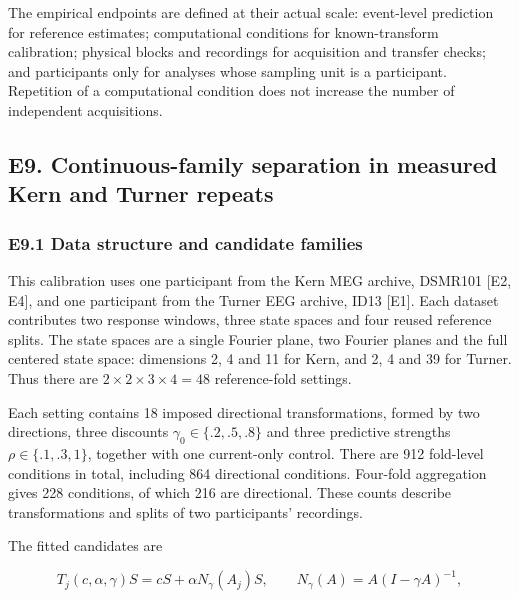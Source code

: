 \documentclass[11pt,a4paper]{article}
\begin{document}
The empirical endpoints are defined at their actual scale: event-level
prediction for reference estimates; computational conditions for
known-transform calibration; physical blocks and recordings for
acquisition and transfer checks; and participants only for analyses
whose sampling unit is a participant. Repetition of a computational
condition does not increase the number of independent acquisitions.

\subsection{E9. Continuous-family separation in measured Kern and Turner
repeats}\label{e9.-continuous-family-separation-in-measured-kern-and-turner-repeats}

\subsubsection{E9.1 Data structure and candidate
families}\label{e9.1-data-structure-and-candidate-families}

This calibration uses one participant from the Kern MEG archive, DSMR101
{[}E2, E4{]}, and one participant from the Turner EEG archive, ID13
{[}E1{]}. Each dataset contributes two response windows, three state
spaces and four reused reference splits. The state spaces are a single
Fourier plane, two Fourier planes and the full centered state space:
dimensions 2, 4 and 11 for Kern, and 2, 4 and 39 for Turner. Thus there
are \(2\times2\times3\times4=48\) reference-fold settings.

Each setting contains 18 imposed directional transformations, formed by
two directions, three discounts \(\gamma_0\in\{.2,.5,.8\}\) and three
predictive strengths \(\rho\in\{.1,.3,1\}\), together with one
current-only control. There are 912 fold-level conditions in total,
including 864 directional conditions. Four-fold aggregation gives 228
conditions, of which 216 are directional. These counts describe
transformations and splits of two participants' recordings.

\par
\noindent\begin{minipage}{\linewidth}

The fitted candidates are

\[
T_j(c,\alpha,\gamma)S=cS+\alpha N_\gamma(A_j)S,
\qquad N_\gamma(A)=A(I-\gamma A)^{-1},
\]

\end{minipage}\par
\end{document}
